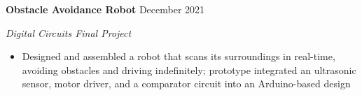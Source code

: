 \documentclass{article}
\begin{document}
\hspace{1.5em} \textbf{Obstacle Avoidance Robot} \hfill December 2021

\hspace{1.5em} \textit{Digital Circuits Final Project}

\vspace{-0.5em}

\begin{itemize}[leftmargin=6.0em]
\setlength{\itemsep}{0em}
\item Designed and assembled a robot that scans its surroundings in real-time, avoiding obstacles and driving indefinitely; prototype integrated an ultrasonic sensor, motor driver, and a comparator circuit into an Arduino-based design
\end{itemize}
\end{document}
